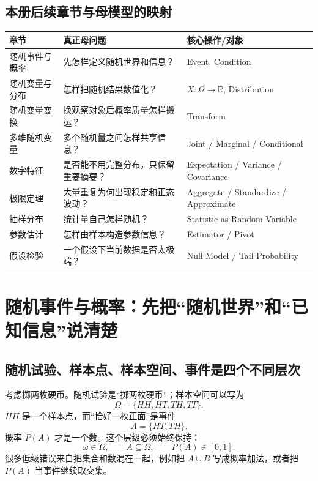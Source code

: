 \documentclass[11pt,a4paper,openany]{ctexbook}
\begin{document}
\section{本册后续章节与母模型的映射}
\begin{longtable}{L{4.3cm}L{5.0cm}L{\dimexpr\linewidth-10.17cm\relax}}
\toprule
\textbf{章节} & \textbf{真正母问题} & \textbf{核心操作/对象}\\
\midrule
随机事件与概率 & 先怎样定义随机世界和信息？ & Event, Condition\\
随机变量与分布 & 怎样把随机结果数值化？ & $X:\Omega\to\mathbb R$, Distribution\\
随机变量变换 & 换观察对象后概率质量怎样搬运？ & Transform\\
多维随机变量 & 多个随机量之间怎样共享信息？ & Joint / Marginal / Conditional\\
数字特征 & 是否能不用完整分布，只保留重要摘要？ & Expectation / Variance / Covariance\\
极限定理 & 大量重复为何出现稳定和正态波动？ & Aggregate / Standardize / Approximate\\
抽样分布 & 统计量自己怎样随机？ & Statistic as Random Variable\\
参数估计 & 怎样由样本构造参数信息？ & Estimator / Pivot\\
假设检验 & 一个假设下当前数据是否太极端？ & Null Model / Tail Probability\\
\bottomrule
\end{longtable}

\chapter{随机事件与概率：先把“随机世界”和“已知信息”说清楚}

\section{随机试验、样本点、样本空间、事件是四个不同层次}
考虑掷两枚硬币。随机试验是“掷两枚硬币”；样本空间可以写为
\[
\Omega=\{HH,HT,TH,TT\}.
\]
$HH$ 是一个样本点，而“恰好一枚正面”是事件
\[
A=\{HT,TH\}.
\]
概率 $P(A)$ 才是一个数。这个层级必须始终保持：
\[
\boxed{\omega\in\Omega,\qquad A\subseteq\Omega,\qquad P(A)\in[0,1].}
\]
很多低级错误来自把集合和数混在一起，例如把 $A\cup B$ 写成概率加法，或者把 $P(A)$ 当事件继续取交集。
\end{document}
